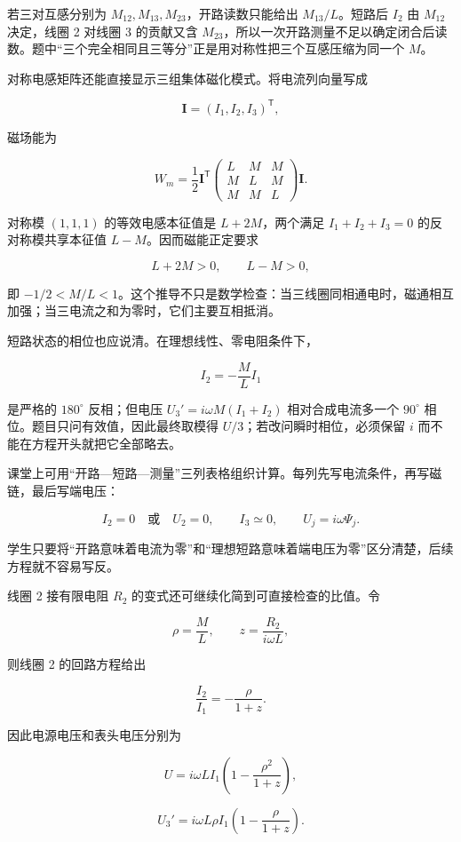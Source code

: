 \documentclass[12pt,a4paper,UTF8]{ctexart}
\begin{document}
若三对互感分别为 \(M_{12},M_{13},M_{23}\)，开路读数只能给出
\(M_{13}/L\)。短路后 \(I_2\) 由 \(M_{12}\) 决定，线圈 2 对线圈 3
的贡献又含
\(M_{23}\)，所以一次开路测量不足以确定闭合后读数。题中``三个完全相同且三等分''正是用对称性把三个互感压缩为同一个
\(M\)。

对称电感矩阵还能直接显示三组集体磁化模式。将电流列向量写成

\[
\boldsymbol I=(I_1,I_2,I_3)^{\mathsf T},
\]

磁场能为

\[
W_m=\frac12\boldsymbol I^{\mathsf T}
\begin{pmatrix}
L&M&M\\
M&L&M\\
M&M&L
\end{pmatrix}
\boldsymbol I.
\]

对称模 \((1,1,1)\) 的等效电感本征值是 \(L+2M\)，两个满足
\(I_1+I_2+I_3=0\) 的反对称模共享本征值 \(L-M\)。因而磁能正定要求

\[
L+2M>0,
\qquad
L-M>0,
\]

即
\(-1/2<M/L<1\)。这个推导不只是数学检查：当三线圈同相通电时，磁通相互加强；当三电流之和为零时，它们主要互相抵消。

短路状态的相位也应说清。在理想线性、零电阻条件下，

\[
I_2=-\frac ML I_1
\]

是严格的 \(180^\circ\) 反相；但电压 \(U_3'=i\omega M(I_1+I_2)\)
相对合成电流多一个 \(90^\circ\) 相位。题目只问有效值，因此最终取模得
\(U/3\)；若改问瞬时相位，必须保留 \(i\) 而不能在方程开头就把它全部略去。

课堂上可用``开路---短路---测量''三列表格组织计算。每列先写电流条件，再写磁链，最后写端电压：

\[
I_2=0
\quad\text{或}\quad
U_2=0,
\qquad
I_3\simeq0,
\qquad
U_j=i\omega\Psi_j.
\]

学生只要将``开路意味着电流为零''和``理想短路意味着端电压为零''区分清楚，后续方程就不容易写反。

线圈 2 接有限电阻 \(R_2\) 的变式还可继续化简到可直接检查的比值。令

\[
\rho=\frac ML,
\qquad
z=\frac{R_2}{i\omega L},
\]

则线圈 2 的回路方程给出

\[
\frac{I_2}{I_1}
=-\frac{\rho}{1+z}.
\]

因此电源电压和表头电压分别为

\[
U=i\omega LI_1
\left(1-\frac{\rho^2}{1+z}\right),
\]

\[
U_3'=i\omega L\rho I_1
\left(1-\frac{\rho}{1+z}\right).
\]
\end{document}
